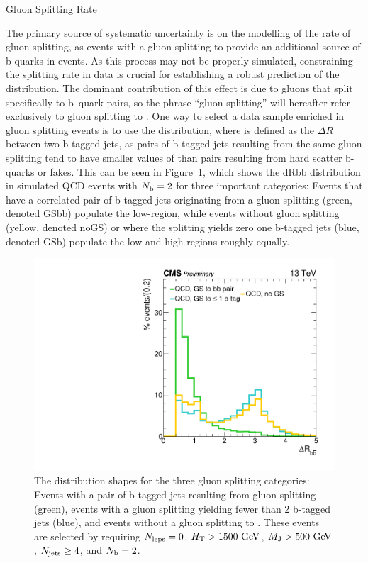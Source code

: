 \begin{section}{Gluon Splitting Rate}

The primary source of systematic uncertainty is on the modelling of the rate of gluon splitting, as events with a gluon splitting to \bbbar provide an additional source of b quarks in events.
As this process may not be properly simulated, constraining the splitting rate in data is crucial for establishing a robust prediction of the \Nb distribution.
The dominant contribution of this effect is due to gluons that split specifically to b~quark pairs, so the phrase ``gluon splitting'' will hereafter refer exclusively to gluon splitting to \bbbar.
One way to select a data sample enriched in gluon splitting events is to use the \dRbb distribution, where \dRbb is defined as the $\Delta R$ between two b-tagged jets, as pairs of b-tagged jets resulting from the same gluon splitting tend to have smaller values of \dRbb than pairs resulting from hard scatter b-quarks or fakes.
This can be seen in Figure~\ref{fig:dRbb_shapes}, which shows the dRbb distribution in simulated QCD events with $N_{\mathrm{b}} = 2$ for three important categories:
Events that have a correlated pair of b-tagged jets originating from a gluon splitting (green, denoted GSbb) populate the low-\dRbb region, while events without gluon splitting (yellow, denoted noGS) or where the splitting yields zero one b-tagged jets (blue, denoted GSb) populate the low-and high-\dRbb regions roughly equally.

\begin{figure}[tbp!]
\begin{center}
\includegraphics[angle=0,width=0.60\columnwidth]{fig/dRbb_shapes.pdf}
\end{center}
\caption{The \dRbb distribution shapes for the three gluon splitting categories: 
Events with a pair of b-tagged jets resulting from gluon splitting (green), events with a gluon splitting yielding fewer than 2 b-tagged jets (blue), and events without a gluon splitting to \bbbar.
These events are selected by requiring $N_{\mathrm{leps}} = 0$, $H_{\mathrm{T}} > 1500~\mathrm{Ge\kern -0.1em V}$, $M_{\mathrm{J}} > 500~\mathrm{Ge\kern -0.1em V}$, $N_{\mathrm{jets}} \geq 4$, and $N_{\mathrm{b}} = 2$.}
\label{fig:dRbb_shapes}
\end{figure}


\end{section}
